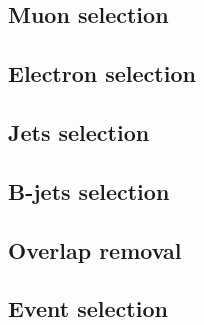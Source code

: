 %


\subsection{Muon selection}
\label{sub:muon_selection}


\subsection{Electron selection}
\label{sub:egamma_selection}


\subsection{Jets selection}
\label{sub:jets_selection}


\subsection{B-jets selection}
\label{sub:bjets_selection}


\subsection{Overlap removal}
\label{sub:overlap_removal}


\subsection{Event selection}
\label{sub:event_selection}


